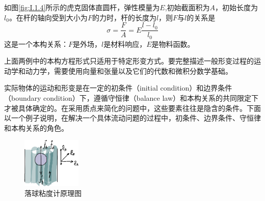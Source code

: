 \documentclass[main.tex]{subfiles}
\begin{document}
\begin{example}[轴向拉伸下的虎克固体本构关系]\label{exp:I.1.4}
如图\ref{fig:I.1.4}所示的虎克固体直圆杆，弹性模量为$E$,初始截面积为$A$，初始长度为$l_0$。在杆的轴向受到大小为$F$的力时，杆的长度为$l$，则$F$与$l$的关系是
\[
\sigma=\frac{F}{A}=E\frac{l-l_0}{l_0}
\]
这是一个本构关系：$F$是外场，$l$是材料响应，$E$是物料函数。
\end{example}
上面两例中的本构方程形式只适用于特定形变方式。要完整描述一般形变过程的运动学和动力学，需要使用向量和张量以及它们的代数和微积分数学基础。

实际物体的运动和形变是在一定的初条件（initial condition）和边界条件（boundary condition）下，遵循守恒律（balance law）和本构关系的共同限定下才被具体确定的。在采用质点来简化的问题中，这些要素往往是隐含的条件。下面以一个例子说明，在解决一个具体流动问题的过程中，初条件、边界条件、守恒律和本构关系的角色。

\begin{figure}[h]
\centering
\includegraphics[width=0.25\textwidth]{images/I.1.5.eps}
\caption{落球粘度计原理图}
\label{fig:I.1.5}
\end{figure}
\end{document}
